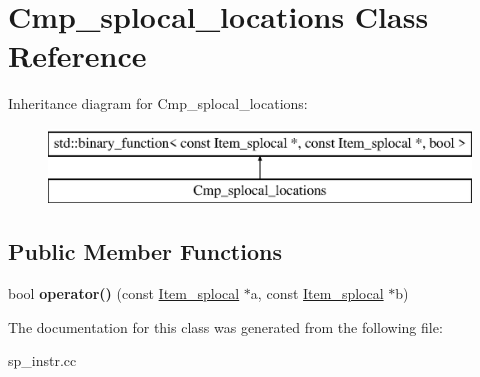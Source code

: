 \hypertarget{classCmp__splocal__locations}{}\section{Cmp\+\_\+splocal\+\_\+locations Class Reference}
\label{classCmp__splocal__locations}
Inheritance diagram for Cmp\+\_\+splocal\+\_\+locations\+:\begin{figure}[H]
\begin{center}
\leavevmode
\includegraphics[height=2.000000cm]{classCmp__splocal__locations}
\end{center}
\end{figure}
\subsection*{Public Member Functions}
\begin{DoxyCompactItemize}
\item 
\mbox{\label{classCmp__splocal__locations_a2b082af6e8a49c39f7aeef3427b29e92}} 
bool {\bfseries operator()} (const \mbox{\hyperlink{classItem__splocal}{Item\+\_\+splocal}} $\ast$a, const \mbox{\hyperlink{classItem__splocal}{Item\+\_\+splocal}} $\ast$b)
\end{DoxyCompactItemize}


The documentation for this class was generated from the following file\+:\begin{DoxyCompactItemize}
\item 
sp\+\_\+instr.\+cc\end{DoxyCompactItemize}
